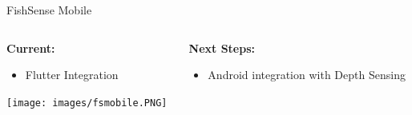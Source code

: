 \begin{frame}{FishSense Mobile}
    \begin{columns}[T] %
        \begin{column}{0.45\textwidth}
            \textbf{Current:}
            \begin{itemize}
                \item Flutter Integration
            \end{itemize}
            \vspace{0.5em}
            \centering
            \texttt{[image: images/fsmobile.PNG]}
        \end{column}
        \begin{column}{0.5\textwidth}
            \textbf{Next Steps:}
            \begin{itemize}
                \item Android integration with Depth Sensing
            \end{itemize}
        \end{column}
    \end{columns}
\end{frame}


